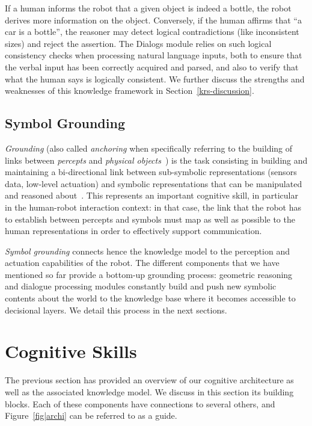 \documentclass[preprint,3p,times]{elsarticle}
\begin{document}
If a human informs the robot that a given object is indeed a bottle, the robot
derives more information on the object. Conversely, if the human affirms that
``a car is a bottle'', the reasoner may detect logical contradictions (like
inconsistent sizes) and reject the assertion. The {\sc Dialogs} module relies
on such logical consistency checks when processing natural language inputs,
both to ensure that the verbal input has been correctly acquired and parsed,
and also to verify that what the human says is logically consistent.  We
further discuss the strengths and weaknesses of this knowledge framework in
Section~\ref{krs-discussion}.

\subsection{Symbol Grounding}

\emph{Grounding} (also called \emph{anchoring} when specifically referring to
the building of links between \emph{percepts} and \emph{physical
objects}~\cite{Coradeschi2003}) is the task consisting in building and
maintaining a bi-directional link between sub-symbolic representations (sensors
data, low-level actuation) and symbolic representations that can be manipulated
and reasoned about~\cite{Harnad1990}. This represents an important cognitive
skill, in particular in the human-robot interaction context: in that case, the
link that the robot has to establish between percepts and symbols must
map as well as possible to the human representations in order to effectively
support communication.

\emph{Symbol grounding} connects hence the knowledge model to the perception and
actuation capabilities of the robot. The different components that we have
mentioned so far provide a bottom-up grounding process: geometric reasoning and
dialogue processing modules constantly build and push new symbolic contents
about the world to the knowledge base where it becomes accessible to decisional
layers. We detail this process in the next sections. 


\section{Cognitive Skills}
\label{sec:impl}

The previous section has provided an overview of our cognitive architecture
as well as the associated knowledge model. We discuss in this section its
building blocks. Each of these components have connections to several
others, and Figure~\ref{fig|archi} can be referred to as a guide.
\end{document}
